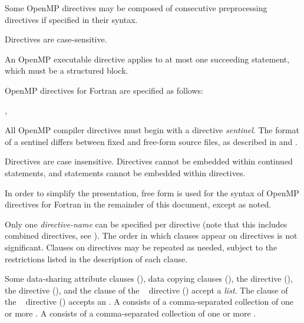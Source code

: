 Some OpenMP directives may be composed of consecutive  preprocessing 
directives if specified in their syntax.

Directives are case-sensitive. 

An OpenMP executable directive applies to at most one succeeding statement, which 
must be a structured block.
\ccppspecificend

\fortranspecificstart
OpenMP directives for Fortran are specified as follows:

\begin{boxedcode}
\plc{sentinel directive-name [clause[ [},\plc{] clause]...]}
\end{boxedcode}

All OpenMP compiler directives must begin with a directive \emph{sentinel}. The format of a 
sentinel differs between fixed and free-form source files, as described in 
 and .

Directives are case insensitive. Directives cannot be embedded within continued 
statements, and statements cannot be embedded within directives.

In order to simplify the presentation, free form is used for the syntax of OpenMP 
directives for Fortran in the remainder of this document, except as noted.
\fortranspecificend

Only one \emph{directive-name} can be specified per directive (note that this includes combined 
directives, see ).  The order in which clauses appear on directives 
is not significant. Clauses on directives may be repeated as needed, subject to the 
restrictions listed in the description of each clause.

Some data-sharing attribute clauses (), 
data copying clauses (), the 
 directive (), 
the  directive (), and the 
 clause of the ~ directive 
() accept a \emph{list}. The 
 clause of the ~ directive 
() accepts an . 
A  consists of a comma-separated collection of one or more 
. A  consists of a comma-separated 
collection of one or more . 

